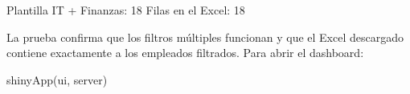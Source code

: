 \begin{rsalida}
Plantilla IT + Finanzas: 18 
Filas en el Excel: 18 
\end{rsalida}

La prueba confirma que los filtros múltiples funcionan y que el Excel
descargado contiene exactamente a los empleados filtrados. Para abrir el
dashboard:

\begin{rnoejecutar}
shinyApp(ui, server)
\end{rnoejecutar}
